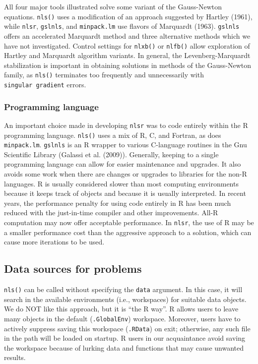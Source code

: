 All four major tools illustrated solve some variant of the Gauss-Newton
equations. \texttt{nls()} uses a modification of an approach suggested by Hartley (1961),
while \texttt{nlsr}, \texttt{gslnls}, and \texttt{minpack.lm} use flavors of Marquardt (1963). \texttt{gslnls}
offers an accelerated Marquardt method and three alternative methods which we
have not investigated.
Control settings for \texttt{nlxb()} or \texttt{nlfb()} allow exploration of Hartley and Marquardt
algorithm variants. In general, the Levenberg-Marquardt stabilization
is important in obtaining
solutions in methods of the Gauss-Newton family, as \texttt{nls()} terminates
too frequently and unnecessarily with \texttt{singular\ gradient} errors.

\hypertarget{programming-language}{%
\subsubsection{Programming language}\label{programming-language}}

An important choice made in developing \texttt{nlsr} was to code entirely within the R
programming language. \texttt{nls()} uses a mix of R, C, and Fortran, as does \texttt{minpack.lm}.
\texttt{gslnls} is an R wrapper to various C-language routines in the Gnu Scientific
Library (Galassi et al. (2009)).
Generally, keeping to a single programming language can allow for
easier maintenance and upgrades. It also avoids some work when there are changes
or upgrades to libraries for the non-R languages.
R is usually considered slower
than most computing environments because it keeps track of objects and
because it is usually interpreted. In recent years, the
performance penalty for using code entirely in R has been much reduced
with the just-in-time compiler and other improvements. All-R computation
may now offer acceptable performance. In \texttt{nlsr}, the use of R may be a
smaller performance cost than the aggressive approach to a solution,
which can cause more iterations to be used.

\hypertarget{data-sources-for-problems}{%
\subsection{Data sources for problems}\label{data-sources-for-problems}}

\texttt{nls()} can be called without specifying the \texttt{data} argument. In this case, it will
search in the available environments (i.e., workspaces) for suitable data objects.
We do NOT like this approach, but it is ``the R way''. R allows users to leave many
objects in the default (\texttt{.GlobalEnv}) workspace. Moreover, users have to actively
suppress saving this workspace (\texttt{.RData}) on exit; otherwise, any such file in
the path will be loaded on startup. R users in our
acquaintance avoid saving the workspace because of lurking data and
functions that may cause unwanted results.

